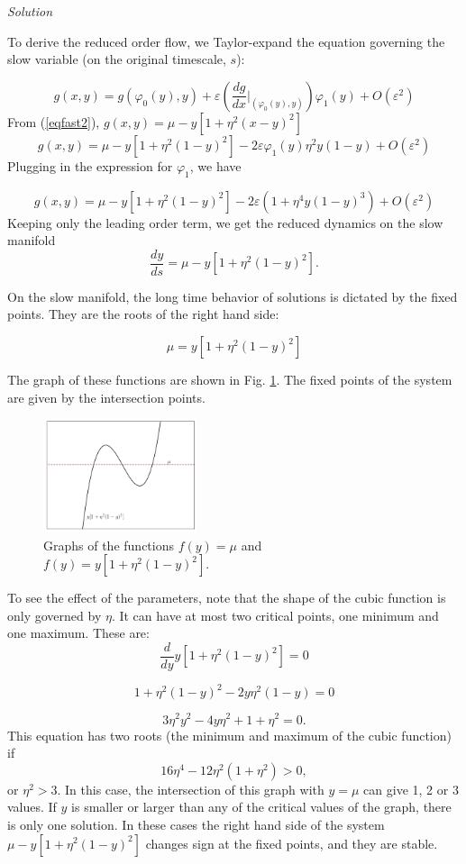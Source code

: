 \begin{solution}[9.7]
\emph{Solution}

To derive the reduced order flow, we Taylor-expand the equation governing the slow variable (on the original timescale, $s$):

\begin{equation*}
    g(x,y) = g(\varphi_0(y), y) + \varepsilon\left(\frac{d g}{dx}|_{(\varphi_0(y),y)}\right)\varphi_1(y) + O(\varepsilon^2)
\end{equation*}
From (\ref{eqfast2}), $g(x,y)= \mu - y[1+\eta^2(x-y)^2]$
$$
g(x,y) = \mu - y[1+\eta^2(1-y)^2] -2 \varepsilon\varphi_1(y)\eta^2y(1-y) + O(\varepsilon^2)
$$
Plugging in the expression for $\varphi_1$, we have

$$
g(x,y) = \mu - y[1+\eta^2(1-y)^2] -2 \varepsilon(1 + \eta^4y(1-y)^3) + O(\varepsilon^2)
$$
Keeping only the leading order term, we get the reduced dynamics on the slow manifold
$$
\frac{dy}{ds} = \mu - y[1+\eta^2(1-y)^2].
$$

On the slow manifold, the long time behavior of solutions is dictated by the fixed points. They are the roots of the right hand side:

$$
\mu = y[1+\eta^2(1-y)^2]
$$

The graph of these functions are shown in Fig. \ref{fig:c}. The fixed points of the system are given by the intersection points. 
\begin{figure}[h!]
    \centering
    \includegraphics[width = 0.4\textwidth]{figures/solutions/ch9/cubic.png}
    \caption{Graphs of the functions $f(y) = \mu$ and $f(y)= y[1+\eta^2(1-y)^2]$.}
    \label{fig:c}
\end{figure}
To see the effect of the parameters, note that the shape of the cubic function is only governed by $\eta$. It can have at most two critical points, one minimum and one maximum. These are:
$$
\frac{d}{dy}y[1+\eta^2(1-y)^2] =0
$$

$$
1 + \eta^2(1-y)^2 - 2y \eta^2 (1-y) = 0
$$

$$
3\eta^2 y^2 - 4y\eta^2 +1 + \eta^2 = 0.
$$
This equation has two roots (the minimum and maximum of the cubic function) if 
$$
16\eta^4 - 12\eta^2(1+\eta^2) > 0,
$$
or $\eta^2 > 3$. In this case, the intersection of this graph with $y=\mu$ can give 1, 2 or 3 values. If $y$ is smaller or larger than any of the critical values of the graph, there is only one solution. In these cases the right hand side of the system $\mu - y[1+\eta^2(1-y)^2]$ changes sign at the fixed points, and they are stable. 


\end{solution}

